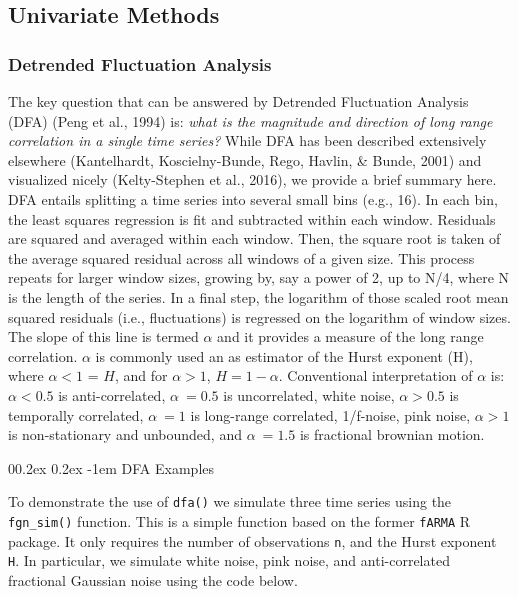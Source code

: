 \documentclass[
  man]{apa6}
\makeatletter
\let\oldparagraph\paragraph
\renewcommand{\paragraph}[1]{\oldparagraph{#1}\mbox{}}
\renewcommand{\paragraph}{\@startsection{paragraph}{4}{\parindent}%
  {0\baselineskip \@plus 0.2ex \@minus 0.2ex}%
  {-1em}%
  {\normalfont\normalsize\bfseries\itshape\typesectitle}}
\makeatother
\begin{document}
\hypertarget{univariate-methods}{%
\subsection{Univariate Methods}\label{univariate-methods}}

\hypertarget{detrended-fluctuation-analysis}{%
\subsubsection{Detrended Fluctuation Analysis}\label{detrended-fluctuation-analysis}}

The key question that can be answered by Detrended Fluctuation Analysis
(DFA) (Peng et al., 1994) is: \emph{what is the magnitude and
direction of long range correlation in a single time series?} While DFA
has been described extensively elsewhere
(Kantelhardt, Koscielny-Bunde, Rego, Havlin, \& Bunde, 2001) and visualized nicely
(Kelty-Stephen et al., 2016), we provide a brief
summary here. DFA entails splitting a time series into several small
bins (e.g., 16). In each bin, the least squares regression is fit and
subtracted within each window. Residuals are squared and averaged within
each window. Then, the square root is taken of the average squared
residual across all windows of a given size. This process repeats for
larger window sizes, growing by, say a power of 2, up to N/4, where N is
the length of the series. In a final step, the logarithm of those scaled
root mean squared residuals (i.e., fluctuations) is regressed on the
logarithm of window sizes. The slope of this line is termed \(\alpha\) and
it provides a measure of the long range correlation. \(\alpha\) is
commonly used an as estimator of the Hurst exponent (H), where
\(\alpha<1\) = \(H\), and for \(\alpha>1\), \(H = 1 - \alpha\). Conventional
interpretation of \(\alpha\) is: \(\alpha < 0.5\) is anti-correlated,
\(\alpha ~= 0.5\) is uncorrelated, white noise, \(\alpha > 0.5\) is
temporally correlated, \(\alpha ~= 1\) is long-range correlated,
1/f-noise, pink noise, \(\alpha > 1\) is non-stationary and unbounded, and
\(\alpha ~= 1.5\) is fractional brownian motion.

\hypertarget{dfa-examples}{%
\paragraph{DFA Examples}\label{dfa-examples}}

To demonstrate the use of \texttt{dfa()} we simulate three time series using
the \texttt{fgn\_sim()} function. This is a simple function based on the former
\texttt{fARMA} R package. It only requires the number of observations \texttt{n}, and
the Hurst exponent \texttt{H}. In particular, we simulate white noise, pink
noise, and anti-correlated fractional Gaussian noise using the code
below.
\end{document}

